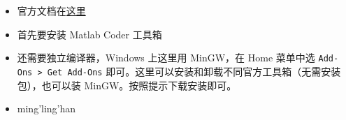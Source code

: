
\begin{itemize}
\item 官方文档在\href{https://ch.mathworks.com/help/coder/index.html?s_tid=CRUX_lftnav}{这里}
\item 首先要安装 Matlab Coder 工具箱
\item 还需要独立编译器，Windows 上这里用 MinGW，在 Home 菜单中选 \verb`Add-Ons > Get Add-Ons` 即可。这里可以安装和卸载不同官方工具箱（无需安装包），也可以装 MinGW。按照提示下载安装即可。
\item ming'ling'han
\end{itemize}
